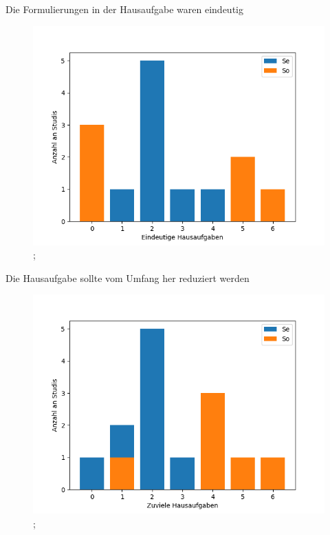 \documentclass[10pt]{beamer}
\begin{document}
\begin{frame}[fragile]{Die Formulierungen in der Hausaufgabe waren eindeutig} 
 \begin{figure}
 \includegraphics[width= 0.9\linewidth]{./PDFcreater/Plots/Nx/Die+Formulierungen+in+der+Hausaufgabe+waren+eindeutig.png};
 \end{figure}
 \end{frame}
\begin{frame}[fragile]{Die Hausaufgabe sollte vom Umfang her reduziert werden} 
 \begin{figure}
 \includegraphics[width= 0.9\linewidth]{./PDFcreater/Plots/Nx/Die+Hausaufgabe+sollte+vom+Umfang+her+reduziert+werden.png};
 \end{figure}
 \end{frame}
\end{document}
